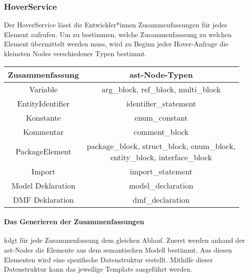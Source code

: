 \documentclass[./einleitung.tex]{subfiles}
\begin{document}
    \subsubsection[HoverService]{HoverService }\label{subsubsec:hover-service}
    Der HoverService lässt die Entwickler*innen Zusammenfassungen für jedes Element aufrufen.
    Um zu bestimmen, welche Zusammenfasssung zu welchen Element übermittelt werden muss, wird zu Beginn jeder Hover-Anfrage die kleinsten Nodes verschiedener Typen bestimmt.
    \begin{center}
        \begin{tabular}{|c|c|}
            \hline
            Zusammenfassung & \acrshort{ast}-Node-Typen \\
            \hline
            Variable & arg_block, ref_block, multi_block \\
            \hline
            EntityIdentifier & identifier_statement\\
            \hline
            Konstante & enum_constant \\
            \hline
            Kommentar & comment_block \\
            \hline
            PackageElement & \makecell{package_block, struct_block, enum_block,\\entity_block, interface_block} \\
            \hline
            Import & import_statement\\
            \hline
            Model Deklaration & model_declaration \\
            \hline
            DMF Deklaration & dmf_declaration \\
            \hline
        \end{tabular}
    \end{center}

    
    \paragraph{Das Generieren der Zusammenfassungen} folgt für jede Zusammenfassung dem gleichen Ablauf.
    Zuerst werden anhand der \acrshort{ast}-Nodes die Elemente aus dem semantischen Modell bestimmt.
    Aus diesen Elementen wird eine spezifische Datenstruktur erstellt.
    Mithilfe dieser Datenstruktur kann das jeweilige Template ausgeführt werden.
\end{document}
